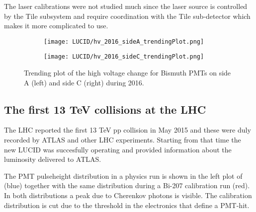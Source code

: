 The laser calibrations were not studied much since the laser source is controlled by the Tile subsystem and require 
coordination with the Tile sub-detector which makes it more complicated to use.

\begin{figure}
\centering
\begin{subfigure}{.5\textwidth}
  \centering
  \texttt{[image: LUCID/hv\_2016\_sideA\_trendingPlot.png]}
  \label{fig:sub3}
\end{subfigure}%
\begin{subfigure}{.5\textwidth}
  \centering
  \texttt{[image: LUCID/hv\_2016\_sideC\_trendingPlot.png]}
  \label{fig:sub4}
\end{subfigure}
\caption{Trending plot of the high voltage change for Bismuth PMTs on side A (left) and side C (right) during 2016.}
\label{fig:hv_trending_plot_2016}
\end{figure}





\subsection{The first 13 TeV collisions at the LHC}
\label{sec:physics}

The LHC reported the first 13 TeV pp collision in May 2015 and these were  duly recorded by ATLAS and other LHC experiments. 
Starting from that time the new LUCID was succesfully operating and provided information about the 
luminosity delivered to ATLAS. 

The PMT pulseheight distribution in a physics run is shown in the left plot of  (blue) 
together with the same distribution 
during a Bi-207 calibration run (red). In both distributions a peak due to Cherenkov photons is visible. The 
calibration distribution is cut due to the threshold in the electronics that define a PMT-hit.

